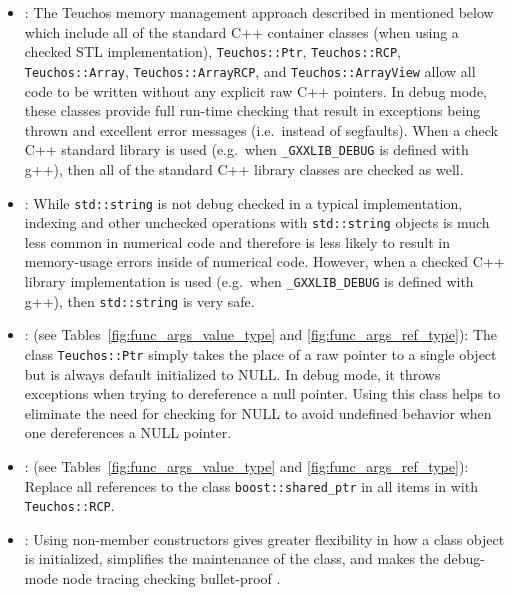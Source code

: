 \begin{itemize}


{}\item\GCGAvoidRawPointers: The Teuchos memory management approach
described in {}\cite{TeuchosMemoryManagementGuide} mentioned below
which include all of the standard C++ container classes (when using a
checked STL implementation), {}\texttt{Teuchos::\-Ptr},
{}\texttt{Teuchos::\-RCP}, {}\texttt{Teuchos::\-Array},
{}\texttt{Teuchos::\-Array\-RCP}, and
{}\texttt{Teuchos::\-Array\-View} allow all code to be written without
any explicit raw C++ pointers.  In debug mode, these classes provide
full run-time checking that result in exceptions being thrown and
excellent error messages (i.e.\ instead of segfaults).  When a check
C++ standard library is used (e.g.\ when {}\texttt{\_GXXLIB\_DEBUG} is
defined with g++), then all of the standard C++ library classes are
checked as well.


{}\item\GCGUseStdString: While {}\texttt{std\-::string} is not debug checked
in a typical implementation, indexing and other unchecked operations with
{}\texttt{std\-::string} objects is much less common in numerical code and
therefore is less likely to result in memory-usage errors inside of numerical
code.  However, when a checked C++ library implementation is used (e.g.\ when
{}\texttt{\_GXXLIB\_DEBUG} is defined with g++), then {}\texttt{std\-::string}
is very safe.


{}\item\GCGTeuchosPtr: (see Tables~\ref{fig:func_args_value_type} and
{}\ref{fig:func_args_ref_type}): The class {}\texttt{Teuchos\-::Ptr} simply
takes the place of a raw pointer to a single object but is always default
initialized to NULL.  In debug mode, it throws exceptions when trying to
dereference a null pointer.  Using this class helps to eliminate the need for
checking for NULL to avoid undefined behavior when one dereferences a NULL
pointer.


{}\item\GCGTeuchosRCP: (see Tables~\ref{fig:func_args_value_type} and
{}\ref{fig:func_args_ref_type}): Replace all references to the class
{}\texttt{boost::\-shared\_ptr} in all items in {}\cite{C++CodingStandards05}
with {}\texttt{Teuchos::\-RCP}.


{}\item\GCGNonmemberConstructors: Using non-member constructors gives
greater flexibility in how a class object is initialized, simplifies
the maintenance of the class, and makes the debug-mode node tracing
checking bullet-proof {}\cite{TeuchosMemoryManagementGuide}.


\end{itemize}
